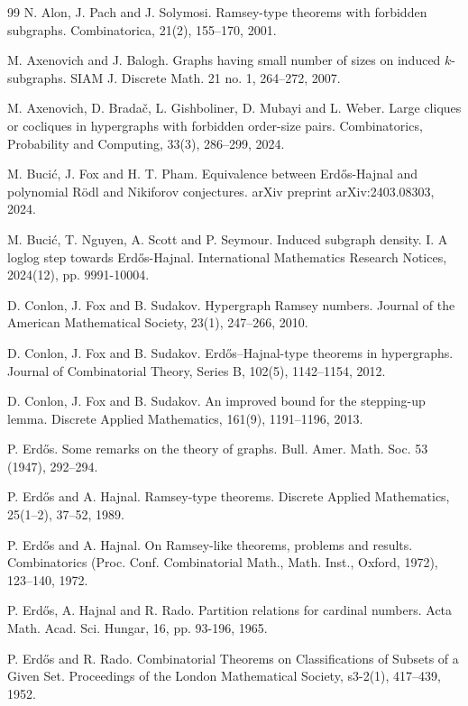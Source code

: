\documentclass[11pt]{article}
\theoremstyle{plain}
\begin{document}
% 
% 
\begin{thebibliography}{99} 
 N. Alon, J. Pach and J. Solymosi. Ramsey-type theorems with forbidden subgraphs. Combinatorica, 21(2), 155–170, 2001.

M. Axenovich and J. Balogh. Graphs having small number of sizes on induced $k$-subgraphs.
SIAM J. Discrete Math. 21 no. 1, 264–272, 2007.

  M. Axenovich, D. Bradač, L. Gishboliner, D. Mubayi and L. Weber. Large cliques or cocliques in hypergraphs with forbidden order-size pairs. Combinatorics, Probability and Computing, 33(3), 286–299, 2024.

M. Bucić, J. Fox and H. T. Pham. Equivalence between Erd\H{o}s-Hajnal and polynomial R\"odl and Nikiforov conjectures. arXiv preprint arXiv:2403.08303, 2024.

M. Bucić, T. Nguyen, A. Scott and P. Seymour. Induced subgraph density. I. A loglog step towards Erdős-Hajnal. International Mathematics Research Notices, 2024(12), pp. 9991-10004. 

D. Conlon, J. Fox and B. Sudakov. Hypergraph Ramsey numbers. Journal of the American Mathematical Society, 23(1), 247–266, 2010.  

D. Conlon, J. Fox and B. Sudakov. Erdős–Hajnal-type theorems in hypergraphs. Journal of Combinatorial Theory, Series B, 102(5), 1142–1154, 2012.  

D. Conlon, J. Fox and B. Sudakov. An improved bound for the stepping-up lemma. Discrete Applied Mathematics, 161(9), 1191–1196, 2013.  

P. Erd\H{o}s. Some remarks on the theory of graphs. Bull. Amer. Math. Soc. 53 (1947), 292–294.

P. Erdős and A. Hajnal. Ramsey-type theorems. Discrete Applied Mathematics, 25(1–2), 37–52, 1989. 

P. Erdős and A. Hajnal. On Ramsey-like theorems, problems and results. Combinatorics (Proc. Conf. Combinatorial Math., Math. Inst., Oxford, 1972), 123–140, 1972.

P. Erd\H{o}s, A. Hajnal and R. Rado. Partition relations for cardinal numbers. Acta Math. Acad. Sci. Hungar, 16, pp. 93-196, 1965.

P. Erdős and R. Rado. Combinatorial Theorems on Classifications of Subsets of a Given Set. Proceedings of the London Mathematical Society, s3-2(1), 417–439, 1952. 


\end{thebibliography}
\end{document}
